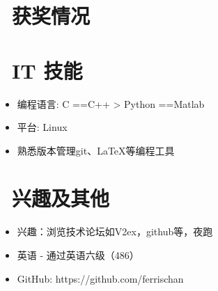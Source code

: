 \documentclass{resume}
\begin{document}
\section{\faHeartO\ 获奖情况}
  
\section{\faCogs\ IT 技能}
\begin{itemize}[parsep=0.5ex]
  \item 编程语言: C ==C++  > Python ==Matlab
  \item 平台: Linux
  \item 熟悉版本管理git、LaTeX等编程工具
\end{itemize}

\section{\faInfo\ 兴趣及其他}
\begin{itemize}[parsep=0.5ex]
  \item 兴趣：浏览技术论坛如V2ex，github等，夜跑  
  \item 英语 - 通过英语六级（486）
  \item GitHub: https://github.com/ferrischan

\end{itemize}

%
%
\end{document}
